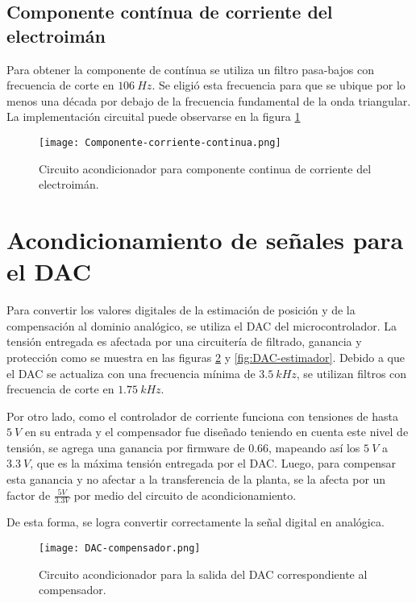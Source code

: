 \subsection{Componente  contínua de corriente del electroimán}

\noindent Para obtener la componente de contínua se utiliza un filtro pasa-bajos con frecuencia de corte en $106\:Hz$. Se eligió esta frecuencia para que se ubique por lo menos una década por debajo de la frecuencia fundamental de la onda triangular. La implementación circuital puede observarse en la figura \ref{fig:componente-corriente-continua}


\begin{figure}[H]
	\centering
	\texttt{[image: Componente-corriente-continua.png]}
	\caption{Circuito acondicionador para componente continua de corriente del electroimán.
	}
	\label{fig:componente-corriente-continua}
\end{figure}

\section{Acondicionamiento de señales para el DAC}

\noindent Para convertir los valores digitales de la estimación de posición y de la compensación al dominio analógico, se utiliza el DAC del microcontrolador. La tensión entregada es afectada por una circuitería de filtrado, ganancia y protección como se muestra en las figuras \ref{fig:DAC-compensador} y \ref{fig:DAC-estimador}. Debido a que el DAC se actualiza con una frecuencia mínima de $3.5\:kHz$, se utilizan filtros con frecuencia de corte en $1.75\:kHz$.

\noindent Por otro lado, como el controlador de corriente funciona con tensiones de hasta $5\:V$ en su entrada y el compensador fue diseñado teniendo en cuenta este nivel de tensión, se agrega una ganancia por firmware de $0.66$, mapeando así los $5\:V$ a $3.3\:V$, que es la máxima tensión entregada por el DAC. Luego, para compensar esta ganancia y no afectar a la transferencia de la planta, se la afecta por un factor de $\frac{5V}{3.3V}$ por medio del circuito de acondicionamiento.

\noindent De esta forma, se logra convertir correctamente la señal digital en analógica.


\begin{figure}[H]
	\centering
	\texttt{[image: DAC-compensador.png]}
	\caption{Circuito acondicionador para la salida del DAC correspondiente al compensador.}
	\label{fig:DAC-compensador}
\end{figure}

